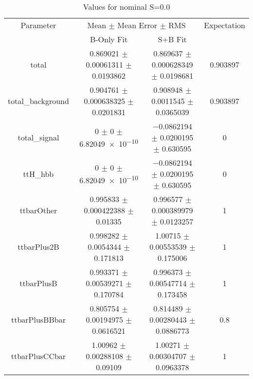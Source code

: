 \begin{table}
\centering
\caption{Values for nominal S=0.0}
\begin{tabular}{cccc}
\toprule
Parameter & \multicolumn{2}{c}{Mean $\pm$ Mean Error $\pm$ RMS} & Expectation\\
 & B-Only Fit & S+B Fit & \\
\midrule
total & \num{0.869021} $\pm$ \num{0.00061311} $\pm$ \num{0.0193862} & \num{0.869637} $\pm$ \num{0.000628349} $\pm$ \num{0.0198681} & \num{0.903897}\\
total\_background & \num{0.904761} $\pm$ \num{0.000638325} $\pm$ \num{0.0201831} & \num{0.908948} $\pm$ \num{0.0011545} $\pm$ \num{0.0365039} & \num{0.903897}\\
total\_signal & \num{0} $\pm$ \num{0} $\pm$ \num{6.82049e-10} & \num{-0.0862194} $\pm$ \num{0.0200195} $\pm$ \num{0.630595} & \num{0}\\
ttH\_hbb & \num{0} $\pm$ \num{0} $\pm$ \num{6.82049e-10} & \num{-0.0862194} $\pm$ \num{0.0200195} $\pm$ \num{0.630595} & \num{0}\\
ttbarOther & \num{0.995833} $\pm$ \num{0.000422388} $\pm$ \num{0.01335} & \num{0.996577} $\pm$ \num{0.000389979} $\pm$ \num{0.0123257} & \num{1}\\
ttbarPlus2B & \num{0.998282} $\pm$ \num{0.0054344} $\pm$ \num{0.171813} & \num{1.00715} $\pm$ \num{0.00553539} $\pm$ \num{0.175006} & \num{1}\\
ttbarPlusB & \num{0.993371} $\pm$ \num{0.00539271} $\pm$ \num{0.170784} & \num{0.996373} $\pm$ \num{0.00547714} $\pm$ \num{0.173458} & \num{1}\\
ttbarPlusBBbar & \num{0.805754} $\pm$ \num{0.00194975} $\pm$ \num{0.0616521} & \num{0.814489} $\pm$ \num{0.00280443} $\pm$ \num{0.0886773} & \num{0.8}\\
ttbarPlusCCbar & \num{1.00962} $\pm$ \num{0.00288108} $\pm$ \num{0.09109} & \num{1.00271} $\pm$ \num{0.00304707} $\pm$ \num{0.0963378} & \num{1}\\
\bottomrule
\end{tabular}
\end{table}